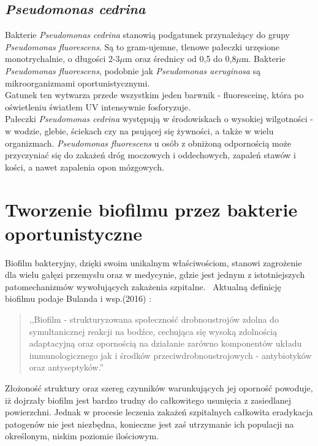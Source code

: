 \documentclass[11pt,a4paper]{report}
\begin{document}
\subsection{\textit{Pseudomonas cedrina}}
Bakterie \textit{Pseudomonas cedrina} stanowią podgatunek przynależący do grupy \textit{Pseudomonas fluorescens}\cite{tax_cedrina}. Są to gram-ujemne, tlenowe pałeczki urzęsione monotrychalnie, o długości 2-3$\mu$m oraz średnicy od 0,5 do 0,8$\mu$m.
Bakterie \textit{Pseudomonas fluorescens}, podobnie jak \textit{Pseudomonas aeruginosa} są mikroorganizmami oportunistycznymi.\\
Gatunek ten wytwarza przede wszystkim jeden barwnik - fluoresceinę, która po oświetleniu światłem UV intensywnie fosforyzuje\cite{cedrina, ps_aer_ksiazka}.\\
Pałeczki \textit{Pseudomonas cedrina} występują w środowiskach o wysokiej wilgotności - w wodzie, glebie, ściekach czy na psującej się żywności, a także w wielu organizmach. \textit{Pseudomonas fluorescens} u osób z obniżoną odpornością może przyczyniać się do zakażeń dróg moczowych i oddechowych, zapaleń stawów i kości, a nawet zapalenia opon mózgowych\cite{ps_aer_ksiazka}.



\section{Tworzenie biofilmu przez bakterie oportunistyczne} 
Biofilm bakteryjny, dzięki swoim unikalnym właściwościom, stanowi zagrożenie dla wielu gałęzi przemysłu oraz w medycynie, gdzie jest jednym z istotniejszych patomechanizmów wywołujących zakażenia szpitalne\cite{zakszpit16}.\
\clearpage
Aktualną definicję biofilmu podaje Bulanda i wsp.(2016) %
:\
\begin{quote}
,,Biofilm - strukturyzowana społeczność drobnoustrojów zdolna do symultanicznej reakcji na bodźce, cechująca się wysoką zdolnością adaptacyjną oraz opornością na działanie zarówno komponentów układu immunologicznego jak i środków przeciwdrobnoustrojowych - antybiotyków oraz antyseptyków.''
\end{quote}

Złożoność struktury oraz szereg czynników warunkujących jej oporność powoduje, iż dojrzały biofilm jest bardzo trudny do całkowitego usunięcia z zasiedlanej powierzchni. Jednak w procesie leczenia zakażeń szpitalnych całkowita eradykacja patogenów nie jest niezbędna, konieczne jest zaś utrzymanie ich populacji na określonym, niskim poziomie ilościowym.
\end{document}

